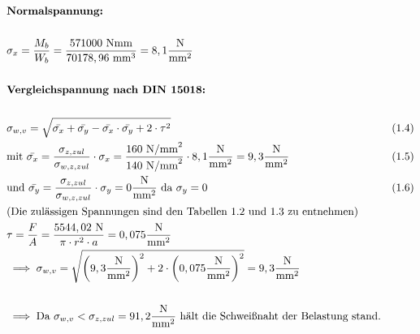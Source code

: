 \begin{itemize}
\begin{align*}
	&\textbf{Normalspannung: } \\ \\
	&\sigma_x = \frac{M_b}{W_b} = \frac{ 571000 \text{ Nmm} }{70178,96 \text{ mm}^3} = 8,1 \frac{\text{N}}{\text{mm}^2}\\ \\
	&\textbf{Vergleichspannung nach DIN 15018: } \\\\
	&\sigma_{w,v} = \sqrt{ \bar{\sigma_x} + \bar{\sigma_y} -\bar{\sigma_x} \cdot \bar{\sigma_y} + 2 \cdot \tau ^2} & (1.4)\\
	&\text{mit } \bar{\sigma_x} = \frac{\sigma_{z,zul}}{\sigma_{w,z,zul}} \cdot \sigma_x  = \frac{160 \text{ N/mm}^2 }{140 \text{ N/mm}^2} \cdot 8,1 \frac{\text{N}}{\text{mm}^2} = 9,3 \frac{\text{N}}{\text{mm}^2} & (1.5) \\
	&\text{und } \bar{\sigma_y} = \frac{\sigma_{z,zul}}{\sigma_{w,z,zul}} \cdot \sigma_y  = 0 \frac{\text{N}}{\text{mm}^2} \text{ da } \sigma_y  = 0 & (1.6) \\
	&\text{(Die zulässigen Spannungen sind den Tabellen 1.2 und 1.3 zu entnehmen)} \\
	&\tau = \frac{F}{A} = \frac{5544,02 \text{ N}}{\pi \cdot r^2 \cdot a} = 0,075 \frac{\text{N}}{\text{mm}^2}\\
	&\implies \sigma_{w,v} = \sqrt{ \left(  9,3 \frac{\text{N}}{\text{mm}^2} \right)^2 + 2 \cdot \left(  0,075 \frac{\text{N}}{\text{mm}^2} \right)^2 } = 9,3\frac{\text{N}}{\text{mm}^2} \\ \\
	&\implies \text{Da }\sigma_{w,v} < \sigma_{z,zul } = 91,2 \frac{\text{N}}{\text{mm}^2}  \text{ hält die Schweißnaht der Belastung stand.}
	\end{align*}
\end{itemize}